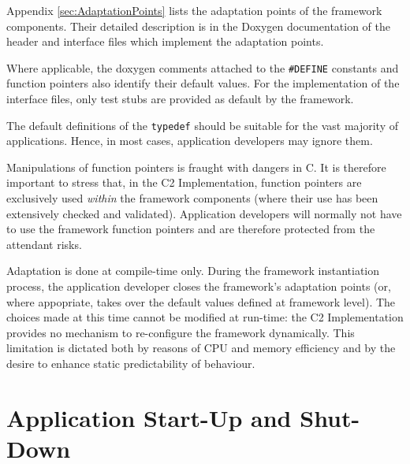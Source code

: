 \documentclass{pnp_article}
\begin{document}

Appendix \ref{sec:AdaptationPoints} lists the adaptation points of the framework components. Their detailed description is in the Doxygen documentation of the header and interface files which implement the adaptation points. 

Where applicable, the doxygen comments attached to the \texttt{\#DEFINE} constants and function pointers also identify their default values. For the implementation of the interface files, only test stubs are provided as default by the framework.

The default definitions of the \texttt{typedef} should be suitable for the vast majority of applications. Hence, in most cases, application developers may ignore them.

Manipulations of function pointers is fraught with dangers in C. It is therefore important to stress that, in the C2 Implementation, function pointers are exclusively used \textit{within} the framework components (where their use has been extensively checked and validated). Application developers will normally not have to use the framework function pointers and are therefore protected from the attendant risks.

Adaptation is done at compile-time only. During the framework instantiation process, the application developer closes the framework's adaptation points (or, where appopriate, takes over the default values defined at framework level). The choices made at this time cannot be modified at run-time: the C2 Implementation provides no mechanism to re-configure the framework dynamically. This limitation is dictated both by reasons of CPU and memory efficiency and by the desire to enhance static predictability of behaviour.

\section{Application Start-Up and Shut-Down}\label{sec:AppStartUpAndShutdown}
\end{document}
